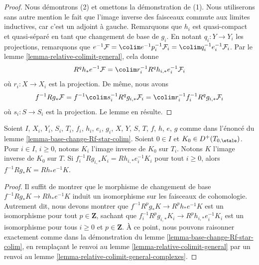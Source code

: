 \begin{proof}
Nous démontrons (2) et omettons la démonstration de (1). Nous utiliserons sans
autre mention le fait que l'image inverse des faisceaux commute aux limites inductives,
car c'est un adjoint à gauche. Remarquons que $h_i$ est quasi-compact et quasi-séparé en tant que
changement de base de $g_i$.
En notant $q_i : Y \to Y_i$ les projections, remarquons que
$e^{-1}\mathcal{F} = \colim e^{-1}p_i^{-1}\mathcal{F}_i =
\colim q_i^{-1}e_i^{-1}\mathcal{F}_i$.
Par le lemme \ref{lemma-relative-colimit-general},
cela donne
$$
R^qh_*e^{-1}\mathcal{F} = \colim r_i^{-1}R^qh_{i, *}e_i^{-1}\mathcal{F}_i
$$
où $r_i : X \to X_i$ est la projection.
De même, nous avons
$$
f^{-1}Rg_*\mathcal{F} =
f^{-1}\colim s_i^{-1}R^qg_{i, *}\mathcal{F}_i =
\colim r_i^{-1}f_i^{-1}R^qg_{i, *}\mathcal{F}_i
$$
où $s_i : S \to S_i$ est la projection. Le lemme en résulte.
\end{proof}

\begin{lemma}
\label{lemma-base-change-Rf-star-colim-complexes}
Soient $I$, $X_i$, $Y_i$, $S_i$, $T_i$, $f_i$, $h_i$, $e_i$, $g_i$,
$X$, $Y$, $S$, $T$, $f$, $h$, $e$, $g$ comme dans l'énoncé
du lemme \ref{lemma-base-change-Rf-star-colim}.
Soient $0 \in I$ et $K_0 \in D^+(T_{0, \etale})$.
Pour $i \in I$, $i \geq 0$, notons $K_i$ l'image inverse de
$K_0$ sur $T_i$. Notons $K$ l'image inverse de $K_0$ sur $T$.
Si $f_i^{-1}Rg_{i, *}K_i = Rh_{i, *}e_i^{-1}K_i$
pour tout $i \geq 0$, alors $f^{-1}Rg_*K = Rh_*e^{-1}K$.
\end{lemma}

\begin{proof}
Il suffit de montrer que le morphisme de changement de base
$f^{-1}Rg_*K \to Rh_*e^{-1}K$ induit un isomorphisme
sur les faisceaux de cohomologie. Autrement dit, nous devons montrer
que $f^{-1}R^pg_*K \to R^ph_*e^{-1}K$ est un isomorphisme
pour tout $p \in \mathbf{Z}$, sachant que
$f_i^{-1}R^pg_{i, *}K_i \to R^ph_{i, *}e_i^{-1}K_i$
est un isomorphisme pour tous $i \geq 0$ et $p \in \mathbf{Z}$.
À ce point, nous pouvons raisonner exactement comme dans la démonstration du
lemme \ref{lemma-base-change-Rf-star-colim},
en remplaçant le renvoi au
lemme \ref{lemma-relative-colimit-general}
par un renvoi au
lemme \ref{lemma-relative-colimit-general-complexes}.
\end{proof}


